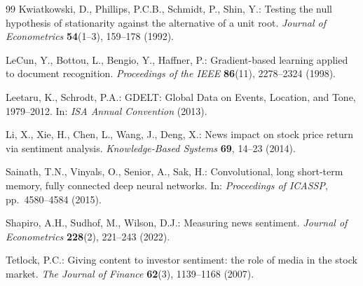 \documentclass[12pt,a4paper]{article}
\begin{document}
\begin{thebibliography}{99}
Kwiatkowski, D., Phillips, P.C.B., Schmidt, P., Shin, Y.:
Testing the null hypothesis of stationarity against the alternative of a unit root.
\emph{Journal of Econometrics} \textbf{54}(1--3), 159--178 (1992).

LeCun, Y., Bottou, L., Bengio, Y., Haffner, P.:
Gradient-based learning applied to document recognition.
\emph{Proceedings of the IEEE} \textbf{86}(11), 2278--2324 (1998).

Leetaru, K., Schrodt, P.A.:
GDELT: Global Data on Events, Location, and Tone, 1979--2012.
In: \emph{ISA Annual Convention} (2013).

Li, X., Xie, H., Chen, L., Wang, J., Deng, X.:
News impact on stock price return via sentiment analysis.
\emph{Knowledge-Based Systems} \textbf{69}, 14--23 (2014).

Sainath, T.N., Vinyals, O., Senior, A., Sak, H.:
Convolutional, long short-term memory, fully connected deep neural networks.
In: \emph{Proceedings of ICASSP}, pp.\ 4580--4584 (2015).

Shapiro, A.H., Sudhof, M., Wilson, D.J.: Measuring news sentiment.
\emph{Journal of Econometrics} \textbf{228}(2), 221--243 (2022).

Tetlock, P.C.: Giving content to investor sentiment: the role of media in the stock market.
\emph{The Journal of Finance} \textbf{62}(3), 1139--1168 (2007).

\end{thebibliography}
\end{document}
